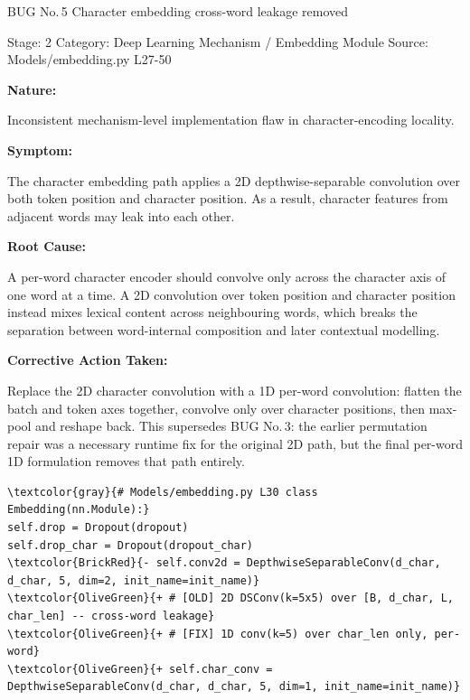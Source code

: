 \documentclass[10pt]{article}
\newcommand{\FieldLabel}[1]{%
 {\bfseries #1:}\par
}
\begin{document}
\begin{bugbox}{BUG No.\,5 \quad Character embedding cross-word leakage removed}
{\color{MetaGray}\small Stage: 2 \;\textbar\; Category: Deep Learning Mechanism / Embedding Module \;\textbar\; Source: Models/embedding.py L27-50\par}
\vspace{0.22em}
\FieldLabel{Nature}
Inconsistent mechanism-level implementation flaw in character-encoding locality.
\par
\vspace{0.35em}
\FieldLabel{Symptom}
The character embedding path applies a 2D depthwise-separable convolution over both token position and character position. As a result, character features from adjacent words may leak into each other.
\par
\vspace{0.35em}
\FieldLabel{Root Cause}
A per-word character encoder should convolve only across the character axis of one word at a time. A 2D convolution over token position and character position instead mixes lexical content across neighbouring words, which breaks the separation between word-internal composition and later contextual modelling.
\par
\vspace{0.35em}
\FieldLabel{Corrective Action Taken}
Replace the 2D character convolution with a 1D per-word convolution: flatten the batch and token axes together, convolve only over character positions, then max-pool and reshape back. This supersedes BUG No.\,3: the earlier permutation repair was a necessary runtime fix for the original 2D path, but the final per-word 1D formulation removes that path entirely.
\par
\vspace{0.35em}
\begin{Verbatim}[commandchars=\\\{\},fontsize=\footnotesize,breaklines=true,breaksymbol={},frame=leftline,framerule=2pt,rulecolor=\color{gray!40},xleftmargin=6pt,formatcom=\singlespacing]
\textcolor{gray}{# Models/embedding.py L30 class Embedding(nn.Module):}
self.drop = Dropout(dropout)
self.drop_char = Dropout(dropout_char)
\textcolor{BrickRed}{- self.conv2d = DepthwiseSeparableConv(d_char, d_char, 5, dim=2, init_name=init_name)}
\textcolor{OliveGreen}{+ # [OLD] 2D DSConv(k=5x5) over [B, d_char, L, char_len] -- cross-word leakage}
\textcolor{OliveGreen}{+ # [FIX] 1D conv(k=5) over char_len only, per-word}
\textcolor{OliveGreen}{+ self.char_conv = DepthwiseSeparableConv(d_char, d_char, 5, dim=1, init_name=init_name)}

\end{Verbatim}
\end{bugbox}
\end{document}
